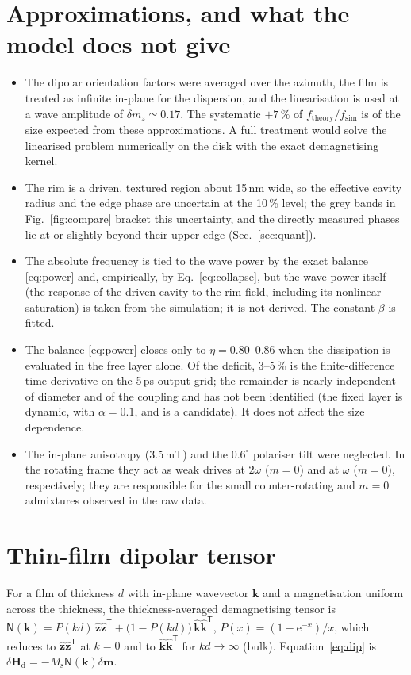 \documentclass[11pt,a4paper]{article}
\newcommand{\vect}[1]{\mathbf{#1}}
\newcommand{\uv}[1]{\hat{\mathbf{#1}}}
\newcommand{\Ms}{M_\mathrm{s}}
\newcommand{\ee}{\mathrm{e}}
\begin{document}
\section{Approximations, and what the model does not give}
\label{sec:limits}
\begin{itemize}
\item The dipolar orientation factors were averaged over the azimuth, the film is treated as infinite in-plane
for the dispersion, and the linearisation is used at a wave amplitude of $\delta m_z\simeq0.17$.  The systematic
$+7\,\%$ of $f_\mathrm{theory}/f_\mathrm{sim}$ is of the size expected from these approximations.  A full
treatment would solve the linearised problem numerically on the disk with the exact demagnetising kernel.
\item The rim is a driven, textured region about 15\,nm wide, so the effective cavity radius and the edge phase
are uncertain at the 10\,\% level; the grey bands in Fig.~\ref{fig:compare} bracket this uncertainty, and the
directly measured phases lie at or slightly beyond their upper edge (Sec.~\ref{sec:quant}).
\item The absolute frequency is tied to the wave power by the exact balance \eqref{eq:power} and, empirically, by
Eq.~\eqref{eq:collapse}, but the wave power itself (the response of the driven cavity to the rim field, including
its nonlinear saturation) is taken from the simulation; it is not derived.  The constant $\beta$ is fitted.
\item The balance \eqref{eq:power} closes only to $\eta=0.80$--$0.86$ when the dissipation is evaluated in the free
layer alone.  Of the deficit, 3--5\,\% is the finite-difference time derivative on the 5\,ps output grid; the
remainder is nearly independent of diameter and of the coupling and has not been identified (the fixed layer is
dynamic, with $\alpha=0.1$, and is a candidate).  It does not affect the size dependence.
\item The in-plane anisotropy (3.5\,mT) and the $0.6^\circ$ polariser tilt were neglected.  In the rotating
frame they act as weak drives at $2\omega$ ($m=0$) and at $\omega$ ($m=0$), respectively; they are responsible for
the small counter-rotating and $m=0$ admixtures observed in the raw data.
\end{itemize}

\appendix
\section{Thin-film dipolar tensor}
For a film of thickness $d$ with in-plane wavevector $\vect k$ and a magnetisation uniform across the thickness,
the thickness-averaged demagnetising tensor is
$\mathsf N(\vect k)=P(kd)\,\uv z\uv z^{\mathsf T}+\big(1-P(kd)\big)\,\uv k\uv k^{\mathsf T}$,
$P(x)=(1-\ee^{-x})/x$, which reduces to $\uv z\uv z^{\mathsf T}$ at $k=0$ and to $\uv k\uv k^{\mathsf T}$ for
$kd\to\infty$ (bulk).  Equation~\eqref{eq:dip} is $\delta\vect H_\mathrm{d}=-\Ms\mathsf N(\vect k)\delta\vect m$.
\end{document}

